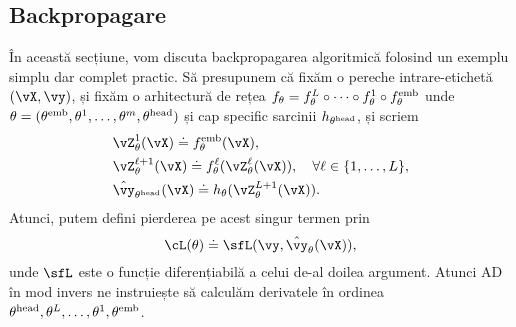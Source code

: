 \documentclass[../../book-main_ro.tex]{subfiles}
\begin{document}
\subsection{Backpropagare}
\label{app:BP-section}
În această secțiune, vom discuta backpropagarea algoritmică folosind un exemplu simplu dar complet practic. Să presupunem că fixăm o pereche intrare-etichetă \((\vX, \vy)\), și fixăm o arhitectură de rețea \(f_{\theta} = f_{\theta}^{L} \circ \cdots \circ f_{\theta}^{1} \circ f_{\theta}^{\mathrm{emb}}\) unde \(\theta = (\theta^{\mathrm{emb}}, \theta^{1}, \dots, \theta^{m}, \theta^{\mathrm{head}})\) și cap specific sarcinii \(h_{\theta^{\mathrm{head}}}\), și scriem
\begin{align}
    &\vZ_{\theta}^{1}(\vX) \doteq f_{\theta}^{\emb}(\vX), \\ 
    &\vZ_{\theta}^{\ell + 1}(\vX) \doteq f_{\theta}^{\ell}(\vZ_{\theta}^{\ell}(\vX)), \quad \forall \ell \in \{1, \dots, L\}, \\
    &\hat{\vy}_{\theta^{\head}}(\vX) \doteq h_{\theta}(\vZ_{\theta}^{L+1}(\vX)).
\end{align}
Atunci, putem defini pierderea pe acest singur termen prin 
\begin{equation}
    \cL(\theta) \doteq \sfL(\vy, \hat{\vy}_{\theta}(\vX)),
\end{equation}
unde \(\sfL\) este o funcție diferențiabilă a celui de-al doilea argument. Atunci AD în mod invers ne instruiește să calculăm derivatele în ordinea \(\theta^{\mathrm{head}}, \theta^{L}, \dots, \theta^{1}, \theta^{\mathrm{emb}}\).
\end{document}
